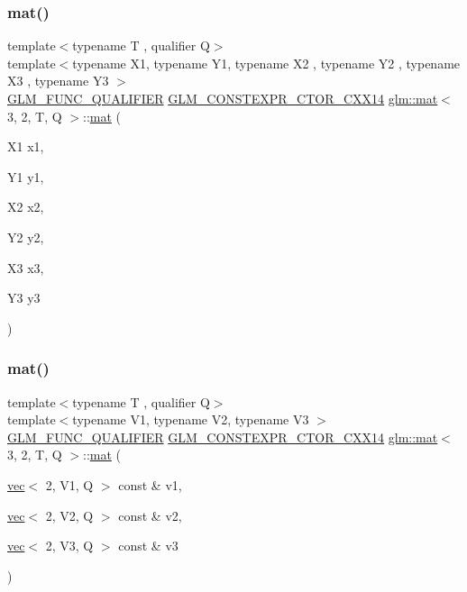 \subsubsection{\texorpdfstring{mat()}{mat()}\hspace{0.1cm}{\footnotesize\ttfamily [19/21]}}
{\footnotesize\ttfamily template$<$typename T , qualifier Q$>$ \\
template$<$typename X1, typename Y1, typename X2 , typename Y2 , typename X3 , typename Y3 $>$ \\
\mbox{\hyperlink{setup_8hpp_a33fdea6f91c5f834105f7415e2a64407}{G\+L\+M\+\_\+\+F\+U\+N\+C\+\_\+\+Q\+U\+A\+L\+I\+F\+I\+ER}} \mbox{\hyperlink{setup_8hpp_a0900f9145e68bf6061b6f5e7be3fa751}{G\+L\+M\+\_\+\+C\+O\+N\+S\+T\+E\+X\+P\+R\+\_\+\+C\+T\+O\+R\+\_\+\+C\+X\+X14}} \mbox{\hyperlink{structglm_1_1mat}{glm\+::mat}}$<$ 3, 2, T, Q $>$\+::\mbox{\hyperlink{structglm_1_1mat}{mat}} (\begin{DoxyParamCaption}\item[{X1}]{x1,  }\item[{Y1}]{y1,  }\item[{X2}]{x2,  }\item[{Y2}]{y2,  }\item[{X3}]{x3,  }\item[{Y3}]{y3 }\end{DoxyParamCaption})}

\mbox{\label{structglm_1_1mat_3_013_00_012_00_01_t_00_01_q_01_4_afe887fa3ecb498d777f704ccfbf90946}} 
\subsubsection{\texorpdfstring{mat()}{mat()}\hspace{0.1cm}{\footnotesize\ttfamily [20/21]}}
{\footnotesize\ttfamily template$<$typename T , qualifier Q$>$ \\
template$<$typename V1, typename V2, typename V3 $>$ \\
\mbox{\hyperlink{setup_8hpp_a33fdea6f91c5f834105f7415e2a64407}{G\+L\+M\+\_\+\+F\+U\+N\+C\+\_\+\+Q\+U\+A\+L\+I\+F\+I\+ER}} \mbox{\hyperlink{setup_8hpp_a0900f9145e68bf6061b6f5e7be3fa751}{G\+L\+M\+\_\+\+C\+O\+N\+S\+T\+E\+X\+P\+R\+\_\+\+C\+T\+O\+R\+\_\+\+C\+X\+X14}} \mbox{\hyperlink{structglm_1_1mat}{glm\+::mat}}$<$ 3, 2, T, Q $>$\+::\mbox{\hyperlink{structglm_1_1mat}{mat}} (\begin{DoxyParamCaption}\item[{\mbox{\hyperlink{structglm_1_1vec}{vec}}$<$ 2, V1, Q $>$ const \&}]{v1,  }\item[{\mbox{\hyperlink{structglm_1_1vec}{vec}}$<$ 2, V2, Q $>$ const \&}]{v2,  }\item[{\mbox{\hyperlink{structglm_1_1vec}{vec}}$<$ 2, V3, Q $>$ const \&}]{v3 }\end{DoxyParamCaption})}

